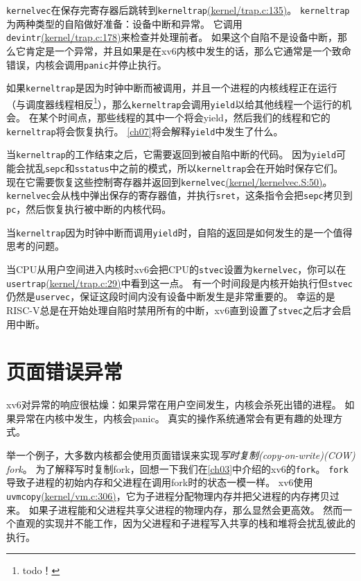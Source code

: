 \texttt{kernelvec}在保存完寄存器后跳转到\texttt{kerneltrap}\href{https://github.com/mit-pdos/xv6-riscv/blob/riscv//kernel/trap.c#L135}{(kernel/trap.c:135)}。
\texttt{kerneltrap}为两种类型的自陷做好准备：设备中断和异常。
它调用\texttt{devintr}\href{https://github.com/mit-pdos/xv6-riscv/blob/riscv//kernel/trap.c#L178}{(kernel/trap.c:178)}来检查并处理前者。
如果这个自陷不是设备中断，那么它肯定是一个异常，并且如果是在xv6内核中发生的话，那么它通常是一个致命错误，内核会调用\texttt{panic}并停止执行。

如果\texttt{kerneltrap}是因为时钟中断而被调用，并且一个进程的内核线程正在运行（与调度器线程相反\footnote{todo！}），那么\texttt{kerneltrap}会调用\texttt{yield}以给其他线程一个运行的机会。
在某个时间点，那些线程的其中一个将会yield，然后我们的线程和它的\texttt{kerneltrap}将会恢复执行。
\autoref{ch07}将会解释\texttt{yield}中发生了什么。

当\texttt{kerneltrap}的工作结束之后，它需要返回到被自陷中断的代码。
因为\texttt{yield}可能会扰乱\texttt{sepc}和\texttt{sstatus}中之前的模式，所以\texttt{kerneltrap}会在开始时保存它们。
现在它需要恢复这些控制寄存器并返回到\texttt{kernelvec}\href{URL}{(kernel/kernelvec.S:50)}。
\texttt{kernelvec}会从栈中弹出保存的寄存器值，并执行\texttt{sret}，这条指令会把\texttt{sepc}拷贝到\texttt{pc}，然后恢复执行被中断的内核代码。

当\texttt{kerneltrap}因为时钟中断而调用\texttt{yield}时，自陷的返回是如何发生的是一个值得思考的问题。

当CPU从用户空间进入内核时xv6会把CPU的\texttt{stvec}设置为\texttt{kernelvec}，你可以在\texttt{usertrap}\href{https://github.com/mit-pdos/xv6-riscv/blob/riscv//kernel/trap.c#L29}{(kernel/trap.c:29)}中看到这一点。
有一个时间段是内核开始执行但\texttt{stvec}仍然是\texttt{uservec}，保证这段时间内没有设备中断发生是非常重要的。
幸运的是RISC-V总是在开始处理自陷时禁用所有的中断，xv6直到设置了\texttt{stvec}之后才会启用中断。

\section{页面错误异常}\label{s4-6}
xv6对异常的响应很枯燥：如果异常在用户空间发生，内核会杀死出错的进程。
如果异常在内核中发生，内核会panic。
真实的操作系统通常会有更有趣的处理方式。

举一个例子，大多数内核都会使用页面错误来实现\emph{写时复制(copy-on-write)(COW) fork}。
为了解释写时复制fork，回想一下我们在\autoref{ch03}中介绍的xv6的\texttt{fork}。
\texttt{fork}导致子进程的初始内存和父进程在调用fork时的状态一模一样。
xv6使用\texttt{uvmcopy}\href{https://github.com/mit-pdos/xv6-riscv/blob/riscv//kernel/vm.c#L306}{(kernel/vm.c:306)}，它为子进程分配物理内存并把父进程的内存拷贝过来。
如果子进程能和父进程共享父进程的物理内存，那么显然会更高效。
然而一个直观的实现并不能工作，因为父进程和子进程写入共享的栈和堆将会扰乱彼此的执行。

